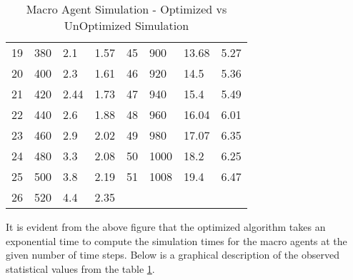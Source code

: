 \begin{table}[H]
\begin{adjustbox}{angle=270}
{\begin{tabular}{|l|l|l|l|l|l|l|l|}
19                                    & 380      & 2.1                        & 1.57                         & 45                                    & 900      & 13.68                      & 5.27                          \\
20                                    & 400      & 2.3                        & 1.61                         & 46                                    & 920      & 14.5                       & 5.36                          \\
21                                    & 420      & 2.44                       & 1.73                         & 47                                    & 940      & 15.4                       & 5.49                          \\
22                                    & 440      & 2.6                        & 1.88                         & 48                                    & 960      & 16.04                      & 6.01                          \\
23                                    & 460      & 2.9                        & 2.02                         & 49                                    & 980      & 17.07                      & 6.35                          \\
24                                    & 480      & 3.3                        & 2.08                         & 50                                    & 1000     & 18.2                       & 6.25                          \\
25                                    & 500      & 3.8                        & 2.19                         & 51                                    & 1008     & 19.4                       & 6.47                          \\
26                                    & 520      & 4.4                        & 2.35                         &                                       &          &                            &                               \\
\hline
\end{tabular}}
\end{adjustbox}
\caption{Macro Agent Simulation - Optimized vs UnOptimized Simulation}
\label{Macro Agent Simulation - Optimized vs UnOptimized Simulation}
\end{table}

It is evident from the above figure that the optimized algorithm takes an exponential time to compute the simulation times for the macro agents at the given number of time steps. Below is a graphical description of the observed statistical values from the table \ref{Macro Agent Simulation - Optimized vs UnOptimized Simulation}.

